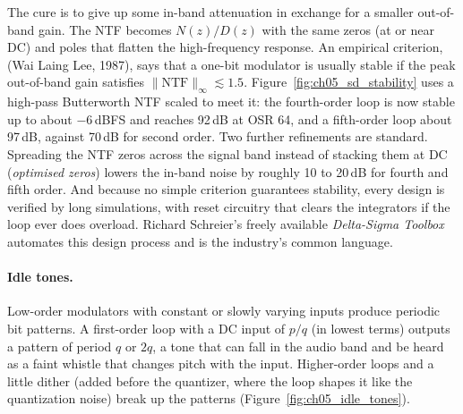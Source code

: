
The cure is to give up some in-band attenuation in exchange for a smaller out-of-band gain. The
NTF becomes $N(z)/D(z)$ with the same zeros (at or near DC) and poles that flatten the
high-frequency response. An empirical criterion,  (Wai Laing Lee, 1987), says
that a one-bit modulator is usually stable if the peak out-of-band gain satisfies
$\|\mathrm{NTF}\|_\infty\lesssim1.5$. Figure~\ref{fig:ch05_sd_stability} uses a high-pass
Butterworth NTF scaled to meet it: the fourth-order loop is now stable up to about $-6$\,dBFS
and reaches 92\,dB at OSR 64, and a fifth-order loop about 97\,dB, against 70\,dB for second
order. Two further refinements are standard. Spreading the NTF zeros across the signal band
instead of stacking them at DC (\emph{optimised zeros}) lowers the in-band noise by roughly 10
to 20\,dB for fourth and fifth order. And because no simple criterion guarantees stability, every
design is verified by long simulations, with reset circuitry that clears the integrators if the
loop ever does overload. Richard Schreier's freely available \emph{Delta-Sigma Toolbox} automates
this design process and is the industry's common language.

\paragraph{Idle tones.} Low-order modulators with constant or slowly varying inputs produce
periodic bit patterns. A first-order loop with a DC input of $p/q$ (in lowest terms) outputs a
pattern of period $q$ or $2q$, a tone that can fall in the audio band and be heard as a faint
whistle that changes pitch with the input. Higher-order loops and a little dither (added before
the quantizer, where the loop shapes it like the quantization noise) break up the patterns
(Figure~\ref{fig:ch05_idle_tones}).


